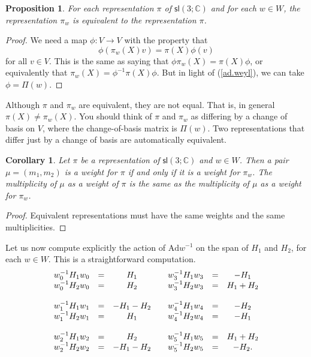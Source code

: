 \documentclass{amsbook}
\theoremstyle{plain}
\newtheorem{corollary}[theorem]{Corollary}
\newtheorem{proposition}[theorem]{Proposition}
\numberwithin{equation}{chapter}
\numberwithin{theorem}{chapter}
\begin{document}
\begin{proposition}
For each representation $\pi$ of $\mathsf{sl}\left(  3;\mathbb{C}\right)  $
and for each $w\in W$, the representation $\pi_{w}$ is equivalent to the
representation $\pi$.
\end{proposition}

\begin{proof}
We need a map $\phi:V\rightarrow V$ with the property that
\[
\phi\left(  \pi_{w}(X)v\right)  =\pi(X)\phi(v)
\]
for all $v\in V$. This is the same as saying that $\phi\pi_{w}(X)=\pi(X)\phi$,
or equivalently that $\pi_{w}(X)=\phi^{-1}\pi(X)\phi$. But in light of
(\ref{ad.weyl}), we can take $\phi=\Pi(w)$.
\end{proof}

Although $\pi$ and $\pi_{w}$ are equivalent, they are not equal. That is, in
general $\pi(X)\neq\pi_{w}(X)$. You should think of $\pi$ and $\pi_{w}$ as
differing by a change of basis on $V$, where the change-of-basis matrix is
$\Pi(w)$. Two representations that differ just by a change of basis are
automatically equivalent.

\begin{corollary}
\label{weyl.weights}Let $\pi$ be a representation of $\mathsf{sl}\left(
3;\mathbb{C}\right)  $ and $w\in W$. Then a pair $\mu=(m_{1},m_{2})$ is a
weight for $\pi$ if and only if it is a weight for $\pi_{w}$. The multiplicity
of $\mu$ as a weight of $\pi$ is the same as the multiplicity of $\mu$ as a
weight for $\pi_{w}$.
\end{corollary}

\begin{proof}
Equivalent representations must have the same weights and the same multiplicities.
\end{proof}

Let us now compute explicitly the action of $\mathrm{Ad}w^{-1}$ on the span of
$H_{1}$ and $H_{2}$, for each $w\in W$. This is a straightforward
computation.
\begin{equation}%
\begin{array}
[c]{ccccccc}%
w_{0}^{-1}H_{1}w_{0} & = & H_{1} &  & w_{3}^{-1}H_{1}w_{3} & = & -H_{1}\\
w_{0}^{-1}H_{2}w_{0} & = & H_{2} &  & w_{3}^{-1}H_{2}w_{3} & = & H_{1}+H_{2}\\
&  &  &  &  &  & \\
w_{1}^{-1}H_{1}w_{1} & = & -H_{1}-H_{2} &  & w_{4}^{-1}H_{1}w_{4} & = &
-H_{2}\\
w_{1}^{-1}H_{2}w_{1} & = & H_{1} &  & w_{4}^{-1}H_{2}w_{4} & = & -H_{1}\\
&  &  &  &  &  & \\
w_{2}^{-1}H_{1}w_{2} & = & H_{2} &  & w_{5}^{-1}H_{1}w_{5} & = & H_{1}+H_{2}\\
w_{2}^{-1}H_{2}w_{2} & = & -H_{1}-H_{2} &  & w_{5}^{-1}H_{2}w_{5} & = &
-H_{2}\text{.}%
\end{array}
\label{weyl.action}%
\end{equation}
\end{document}
